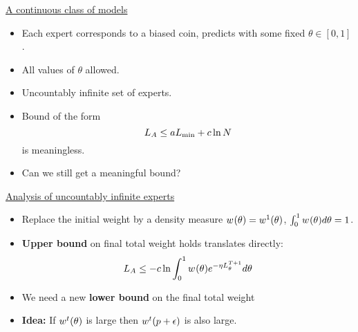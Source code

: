 \begin{flushleft}
\begin{LARGE}
\pagebreak
\begin{center}
\underline{A continuous class of models}
\end{center}
\begin{itemize}
\item
Each expert corresponds to a biased coin, 
predicts with some fixed $\theta \in [0,1]$.
\item
All values of $\theta$ allowed.
\item
Uncountably infinite set of experts.
\item
Bound of the form 
\[
	\TAloss \leq a \BEloss +c \ln N
\]
is meaningless.
\item
Can we still get a meaningful bound?
\end{itemize}
\pagebreak
\begin{center}
\underline{Analysis of uncountably infinite experts}
\end{center}
\begin{itemize}
\item 
Replace the initial weight by a density measure $\dweight{\theta}{} =
\dweight{\theta}{1}$, $\int_0^1 \dweight{\theta}{} d\theta=1$.
\item 
{\bf Upper bound} on final total weight holds translates directly:
\[
 \TAloss \leq -c \ln \int_0^1 \dweight{\theta}{} e^{-\eta \TEloss{\theta}^{T+1}} d\theta
\]
\item
We need a new {\bf lower bound} on the final total weight
\item
{\bf Idea:} If $\dweight{\theta}{t}$ is large then $\dweight{p+\epsilon}{t}$
is also large.
\end{itemize}



\end{LARGE}
\end{flushleft}
